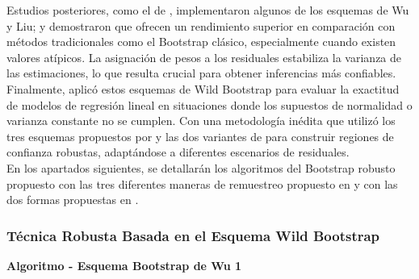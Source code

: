 Estudios posteriores, como el de \textcite{rana-2012}, implementaron algunos de los esquemas de Wu y Liu; y demostraron que ofrecen un rendimiento superior en comparación con métodos tradicionales como el Bootstrap clásico, especialmente cuando existen valores atípicos. La asignación de pesos a los residuales estabiliza la varianza de las estimaciones, lo que resulta crucial para obtener inferencias más confiables.\\


Finalmente, \textcite{zacarias-2023} aplicó estos esquemas de Wild Bootstrap para evaluar la exactitud de modelos de regresión lineal en situaciones donde los supuestos de normalidad o varianza constante no se cumplen. Con una metodología inédita que utilizó los tres esquemas propuestos por \textcite{wu-1986} y las dos variantes de \textcite{liu-1988} para construir regiones de confianza robustas, adaptándose a diferentes escenarios de residuales.\\


En los apartados siguientes, se detallarán los algoritmos del Bootstrap robusto propuesto \textcite{rana-2012} con las tres diferentes maneras de remuestreo propuesto en \textcite{wu-1986} y con las dos formas
propuestas en \textcite{liu-1988}.



\subsubsection{Técnica Robusta Basada en el Esquema Wild Bootstrap}

\textbf{Algoritmo - Esquema Bootstrap de Wu 1}

